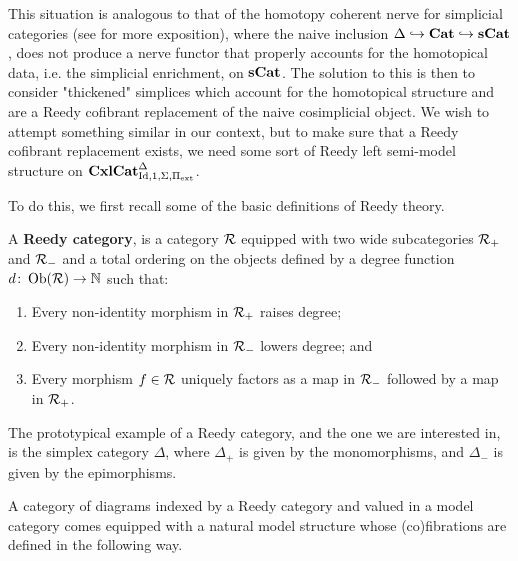 \documentclass{amsart}
\begin{document}
This situation is analogous to that of the homotopy coherent nerve for simplicial categories (see \cite[Ch. 1]{Lurie} for more exposition), where the naive inclusion $\Delta\hookrightarrow\operatorname{\mathbf{Cat}}\hookrightarrow\operatorname{\mathbf{sCat}}$, does not produce a nerve functor that properly accounts for the homotopical data, i.e. the simplicial enrichment, on $\operatorname{\mathbf{sCat}}$. The solution to this is then to consider "thickened" simplices which account for the homotopical structure and are a Reedy cofibrant replacement of the naive cosimplicial object. We wish to attempt something similar in our context, but to make sure that a Reedy cofibrant replacement exists, we need some sort of Reedy left semi-model structure on $\operatorname{\mathbf{CxlCat}}_{\operatorname{Id},1,\Sigma,\Pi_{\operatorname{ext}}}^\Delta$.

To do this, we first recall some of the basic definitions of Reedy theory.

\begin{defn}
    A \textbf{Reedy category}, is a category $\mathcal{R}$ equipped with two wide subcategories $\mathcal{R}_+$ and $\mathcal{R}_-$ and a total ordering on the objects defined by a degree function $d\colon\operatorname{Ob}(\mathcal{R})\to\mathbb{N}$ such that:
    \begin{enumerate}
        \item Every non-identity morphism in $\mathcal{R}_+$ raises degree;
        \item Every non-identity morphism in $\mathcal{R}_-$ lowers degree; and
        \item Every morphism $f\in\mathcal{R}$ uniquely factors as a map in $\mathcal{R}_-$ followed by a map in $\mathcal{R}_+$.
    \end{enumerate}
\end{defn}

\begin{ex}
    The prototypical example of a Reedy category, and the one we are interested in, is the simplex category $\Delta$, where $\Delta_+$ is given by the monomorphisms, and $\Delta_-$ is given by the epimorphisms.
\end{ex}

A category of diagrams indexed by a Reedy category and valued in a model category comes equipped with a natural model structure whose (co)fibrations are defined in the following way.
\end{document}
